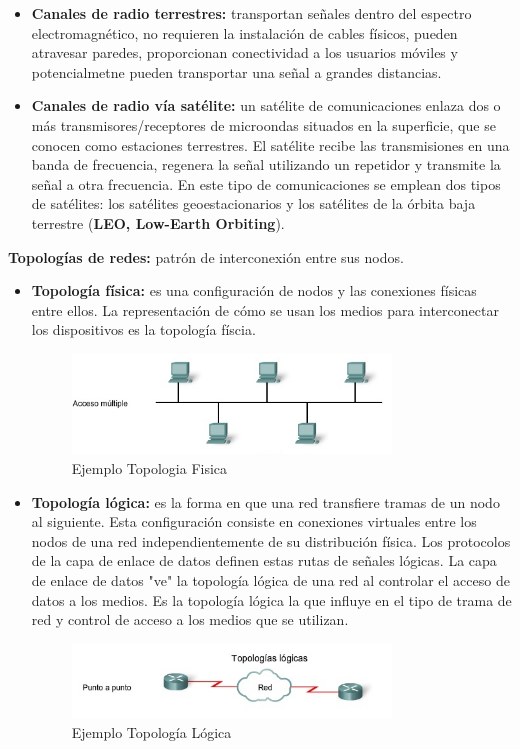 \documentclass[a4paper,11pt]{article}
\begin{document}
\begin{itemize}
\item \textbf{Canales de radio terrestres:} transportan señales dentro del espectro electromagnético, no requieren la instalación de cables físicos, pueden atravesar paredes, proporcionan conectividad a los usuarios móviles y potencialmetne pueden transportar una señal a grandes distancias.

\item \textbf{Canales de radio vía satélite:} un satélite de comunicaciones enlaza dos o más transmisores/receptores de microondas situados en la superficie, que se conocen como estaciones terrestres. El satélite recibe las transmisiones en una banda de frecuencia, regenera la señal utilizando un repetidor y transmite la señal a otra frecuencia. En este tipo de comunicaciones se emplean dos tipos de satélites: los satélites geoestacionarios y los satélites de la órbita baja terrestre (\textbf{LEO, Low-Earth Orbiting}).
\end{itemize}

\textbf{Topologías de redes:} patrón de interconexión entre sus nodos.
\begin{itemize}
\item \textbf{Topología física:} es una configuración de nodos y las conexiones físicas entre ellos. La representación de cómo se usan los medios para interconectar los dispositivos es la topología físcia.

\begin{figure}[h]
\centering
\includegraphics[scale=1,width=0.8\textwidth]{topologia_fisica.png}
\caption{Ejemplo Topologia Fisica}
\end{figure}

\item \textbf{Topología lógica:} es la forma en que una red transfiere tramas de un nodo al siguiente. Esta configuración consiste en conexiones virtuales entre los nodos de una red independientemente de su distribución física. Los protocolos de la capa de enlace de datos definen estas rutas de señales lógicas. La capa de enlace de datos "ve" la topología lógica de una red al controlar el acceso de datos a los medios. Es la topología lógica la que influye en el tipo de trama de red y control de acceso a los medios que se utilizan.

\begin{figure}[h]
\centering
\includegraphics[scale=1,width=0.8\textwidth]{topologia_logica.png}
\caption{Ejemplo Topología Lógica}
\end{figure}

\end{itemize}
\end{document}
